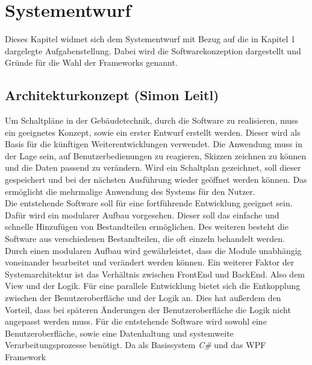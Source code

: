 

\chapter{Systementwurf}
Dieses Kapitel widmet sich dem Systementwurf mit Bezug auf die in Kapitel 1 dargelegte Aufgabenstellung. Dabei wird die Softwarekonzeption 
dargestellt und Gründe für die Wahl der Frameworks genannt. 

\section{Architekturkonzept (Simon Leitl)}
Um Schaltpläne in der Gebäudetechnik, durch die Software zu realisieren, muss ein geeignetes Konzept, sowie ein erster Entwurf erstellt 
werden. Dieser wird als Basis für die künftigen Weiterentwicklungen verwendet. Die Anwendung muss in der Lage sein, auf Benutzerbedienungen 
zu reagieren, Skizzen zeichnen zu können und die Daten passend zu verändern. Wird ein Schaltplan gezeichnet, soll dieser gespeichert und bei 
der nächsten Ausführung wieder geöffnet werden können. Das ermöglicht die mehrmalige Anwendung des Systems für den Nutzer. 
\\Die entstehende Software soll für eine fortführende Entwicklung geeignet sein. Dafür wird ein modularer Aufbau vorgesehen. Dieser soll 
das einfache und schnelle Hinzufügen von Bestandteilen ermöglichen. Des weiteren besteht die Software aus verschiedenen Bestandteilen, die 
oft einzeln behandelt werden. Durch einen modularen Aufbau wird gewährleistet, dass die Module unabhängig voneinander bearbeitet und 
verändert werden können. Ein weiterer Faktor der Systemarchitektur ist das Verhältnis zwischen FrontEnd und BackEnd. Also dem View und der 
Logik. Für eine parallele Entwicklung bietet sich die Entkopplung zwischen der Benutzeroberfläche und der Logik an. Dies hat außerdem den 
Vorteil, dass bei späteren Änderungen der Benutzeroberfläche die Logik nicht angepasst werden muss. Für die entstehende Software wird sowohl 
eine Benutzeroberfläche, sowie eine Datenhaltung und systemweite Verarbeitungsprozesse benötigt. Da als Basissystem \textit{C\#} und das WPF Framework 
